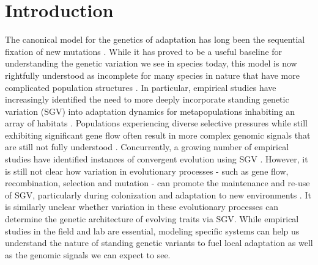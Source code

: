 \documentclass{article}
\begin{document}
\section*{Introduction}

The canonical model for the genetics of adaptation has long been the sequential fixation of new mutations 
\citep{smith_haigh_1974, Endler_1977, Orr_2005}.
While it has proved to be a useful baseline for understanding the genetic variation we see in species today, this model is now rightfully understood as incomplete for many species in nature that have more complicated population structures 
\citep{Lai2152, Schrider2017}. 
In particular, empirical studies have increasingly identified the need to more deeply incorporate standing genetic variation (SGV) into adaptation dynamics for metapopulations inhabiting an array of habitats 
\citep{Hermisson_2008, Barrett2008}. 
Populations experiencing diverse selective pressures while still exhibiting significant gene flow often result in more complex genomic signals that are still not fully understood 
\citep{Charlesworth_1997, Charlesworth_2003, Nosil_2009, Flaxman_2013, Samuk_2017}. 
Concurrently, a growing number of empirical studies have identified instances of convergent evolution using SGV 
\citep{Schrider2017, Barrett2008, Nelson_2018, Nelson_2019, Bassham_2018}. 
However, it is still not clear how variation in evolutionary processes - such as gene flow, recombination, selection and mutation -  can promote the maintenance and re-use of SGV, particularly during colonization and adaptation to new environments
\citep{nelson2017ancient, Pritchard_2010, yeaman2011genetic, Schrider2017}. 
It is similarly unclear whether variation in these evolutionary processes can determine the genetic architecture of evolving traits via SGV. 
While empirical studies in the field and lab are essential, modeling specific systems can help us understand the nature of standing genetic variants to fuel local adaptation as well as the genomic signals we can expect to see.
\end{document}
